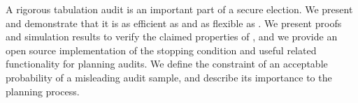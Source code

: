A rigorous tabulation audit is an important part of a secure election. We present \Providence and demonstrate that it is as efficient as \Minerva and as flexible as \BRAVO. We present proofs and simulation results to verify the claimed properties of \Providence, and we provide an open source implementation of the stopping condition and useful related functionality for planning audits. We define the constraint of an acceptable probability of a misleading audit sample, and describe its importance to the planning process. 
